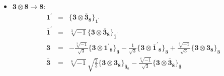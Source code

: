\documentclass[english]{article}
\newcommand{\subcg}[3]{\big\{ {#1}\otimes{#2}\big\}^{}_{#3}}
\newcommand{\rep}[1]{\mathbf{#1}}
\begin{document}
\begin{itemize}
\item $\rep{3}\otimes\rep{8}\to\rep{8}$:
\begin{eqnarray*}
\rep{1^{\prime}} &=& \subcg{\rep{3}}{\rep{\bar{3}}_{\rep{8}}}{\rep{1^{\prime}}}
\\
\rep{\bar{1}^{\prime}} &=& \sqrt[3]{-1}\subcg{\rep{3}}{\rep{\bar{3}}_{\rep{8}}}{\rep{\bar{1}^{\prime}}}
\\
\rep{3} &=& -\frac{\sqrt[3]{-1}}{\sqrt{3}}\subcg{\rep{3}}{\rep{1^{\prime}}_{\rep{8}}}{\rep{3}}-\frac{1}{\sqrt{3}}\subcg{\rep{3}}{\rep{\bar{1}^{\prime}}_{\rep{8}}}{\rep{3}}+\frac{\sqrt[6]{-1}}{\sqrt{3}}\subcg{\rep{3}}{\rep{3}_{\rep{8}}}{\rep{3}}
\\
\rep{\bar{3}} &=& \sqrt[6]{-1} \sqrt{\frac{2}{3}}\subcg{\rep{3}}{\rep{3}_{\rep{8}}}{\rep{\bar{3}}_{a}}-\frac{\sqrt[6]{-1}}{\sqrt{3}}\subcg{\rep{3}}{\rep{\bar{3}}_{\rep{8}}}{\rep{\bar{3}}}
\end{eqnarray*}
\end{itemize}
\end{document}
